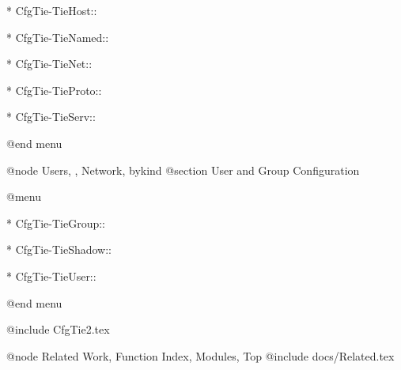 * CfgTie-TieHost::	

* CfgTie-TieNamed::	

* CfgTie-TieNet::	

* CfgTie-TieProto::	

* CfgTie-TieServ::	

@end menu

@node Users, , Network, bykind
@section User and Group Configuration

@menu

* CfgTie-TieGroup::

* CfgTie-TieShadow::

* CfgTie-TieUser:: 

@end menu

@include CfgTie2.tex


@node Related Work, Function Index, Modules, Top
@include docs/Related.tex



